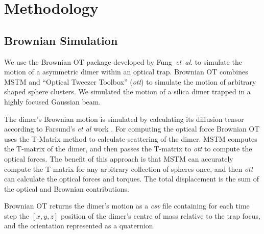 \documentclass[final,  3p]{elsarticle}
\begin{document}
\section{Methodology}
\label{sec:Method}

\subsection{Brownian Simulation}
\label{sec:brownian}

We use the Brownian OT package developed by Fung~\textit{et~al}. \cite{Vigilante2020Brownian_OT} to simulate the motion of a asymmetric dimer within an optical trap. Brownian OT combines MSTM \cite{Mishchenko1996MSTM} and ``Optical Tweezer Toolbox'' (\textit{ott}) \cite{Lenton2020} to simulate the motion of arbitrary
shaped sphere clusters. We simulated the motion of a silica dimer
trapped in a highly focused Gaussian beam.   

The dimer's Brownian motion is simulated by calculating its diffusion tensor according to Farsund's \emph{et al} work \cite{Farsund1996}. For computing the optical force Brownian OT uses the T-Matrix method to calculate scattering of the dimer. MSTM computes the T-matrix of the dimer, and then passes the T-matrix to \textit{ott} to compute the optical forces. The benefit of this approach is that MSTM can accurately compute the T-matrix for any arbitrary collection of spheres once, and then \textit{ott} can calculate the optical forces and torques. The total displacement is the sum of the optical and Brownian contributions.

Brownian OT returns the dimer's motion as a \textit{csv} file containing for each time step the $[x,y,z]$ position of the dimer's centre of mass relative to the trap focus, and the orientation represented as a quaternion.
\end{document}
